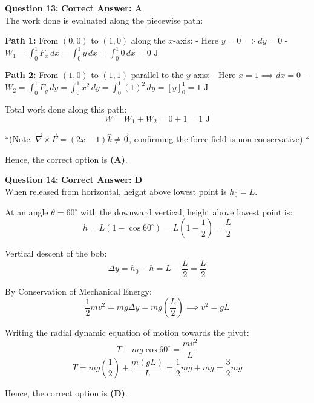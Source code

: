 \documentclass[11pt,a4paper]{article}
\begin{document}
\begin{tcolorbox}[solbox]
\textbf{\textcolor{primaryDark}{Question 13:}} \hfill \textbf{\textcolor{l1Green}{Correct Answer: A}}\\
\vspace{4pt}
The work done is evaluated along the piecewise path:

\textbf{Path 1:} From $(0,0)$ to $(1,0)$ along the $x$-axis:
- Here $y = 0 \implies dy = 0$
- $W_1 = \int_0^1 F_x\, dx = \int_0^1 y\, dx = \int_0^1 0\, dx = 0\text{ J}$

\textbf{Path 2:} From $(1,0)$ to $(1,1)$ parallel to the $y$-axis:
- Here $x = 1 \implies dx = 0$
- $W_2 = \int_0^1 F_y\, dy = \int_0^1 x^2\, dy = \int_0^1 (1)^2\, dy = [y]_0^1 = 1\text{ J}$

Total work done along this path:
$$W = W_1 + W_2 = 0 + 1 = 1\text{ J}$$

*(Note: $\vec{\nabla} \times \vec{F} = (2x - 1)\hat{k} \neq \vec{0}$, confirming the force field is non-conservative).*

Hence, the correct option is \textbf{(A)}.
\end{tcolorbox}

\begin{tcolorbox}[solbox]
\textbf{\textcolor{primaryDark}{Question 14:}} \hfill \textbf{\textcolor{l1Green}{Correct Answer: D}}\\
\vspace{4pt}
When released from horizontal, height above lowest point is $h_0 = L$.

At an angle $\theta = 60^\circ$ with the downward vertical, height above lowest point is:
$$h = L(1 - \cos 60^\circ) = L\left(1 - \frac{1}{2}\right) = \frac{L}{2}$$

Vertical descent of the bob:
$$\Delta y = h_0 - h = L - \frac{L}{2} = \frac{L}{2}$$

By Conservation of Mechanical Energy:
$$\frac{1}{2}m v^2 = mg \Delta y = mg\left(\frac{L}{2}\right) \implies v^2 = gL$$

Writing the radial dynamic equation of motion towards the pivot:
$$T - mg\cos 60^\circ = \frac{m v^2}{L}$$
$$T = mg\left(\frac{1}{2}\right) + \frac{m(gL)}{L} = \frac{1}{2}mg + mg = \frac{3}{2}mg$$

Hence, the correct option is \textbf{(D)}.
\end{tcolorbox}
\end{document}
